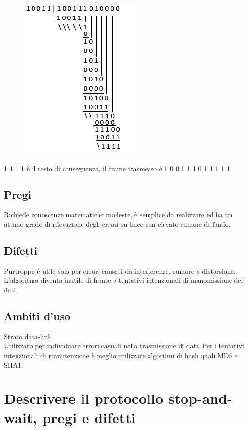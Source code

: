 \begin{figure}[H]
\centering
\includegraphics[scale=0.65]{res/img/16_DivisioneEsCRC.png}
\end{figure}
             
1 1 1 1 è il resto di conseguenza, il frame trasmesso è 1 0 0 1  1 1 0 1  1 1 1 1.

\subsection{Pregi}
Richiede conoscenze matematiche modeste, è semplice da realizzare ed ha un ottimo grado di rilevazione degli errori su linee con elevato rumore di fondo.

\subsection{Difetti}
Purtroppo è utile solo per errori causati da interferenze, rumore o distorsione. L'algoritmo diventa inutile di fronte a tentativi intenzionali di manomissione dei dati.

\subsection{Ambiti d'uso}
Strato data-link.\\
Utilizzato per individuare errori casuali nella trasmissione di dati. Per i tentativi intenzionali di manutenzione è meglio utilizzare algoritmi di hash quali MD5 e SHA1.

\section{Descrivere il protocollo stop-and-wait, pregi e difetti}

